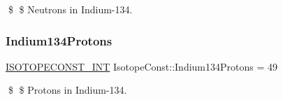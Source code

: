 \$ \$ Neutrons in Indium-\/134. \mbox{\label{group___isotope_const-_indium-_in134_ga4205effee2bf2c293d2057f9d66e9bb0}} 
\subsubsection{\texorpdfstring{Indium134\+Protons}{Indium134Protons}}
{\footnotesize\ttfamily \mbox{\hyperlink{group___isotope_const-_macros_ga5f18360b3e99483a35c32d789e62621c}{I\+S\+O\+T\+O\+P\+E\+C\+O\+N\+S\+T\+\_\+\+I\+NT}} Isotope\+Const\+::\+Indium134\+Protons = 49}

\$ \$ Protons in Indium-\/134. 